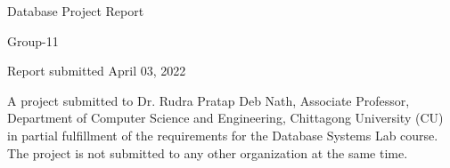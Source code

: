 \begin{titlepage}
\begin{center}
    {\large
      Database Project Report %
    }\\
    \vspace{0.2cm}
    {\Large
      Group-11 %
      
    }
  \end{center}
  \vfill
  
  \begin{center}
  Report submitted April 03, 2022
  \end{center}
	\vfill
A project submitted to Dr. Rudra Pratap Deb Nath, Associate Professor, Department of Computer Science and Engineering, Chittagong University (CU) in partial fulfillment of the requirements for the Database Systems Lab course. The project is not submitted to any other organization at the same time. 

\end{titlepage}
\clearpage
